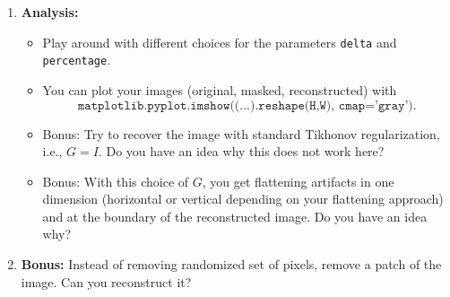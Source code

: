 \begin{enumerate}
\begin{itemize}
	 \end{itemize}
 	\item \textbf{Analysis:} 
 	\begin{itemize}
 		\item Play around with different choices for the parameters \texttt{delta} and \texttt{percentage}.
 		\item You can plot your images (original, masked, reconstructed) with $$\texttt{matplotlib.pyplot.imshow((...).reshape(H,W), cmap='gray')}.$$
 		\item Bonus: Try to recover the image with standard Tikhonov regularization, i.e., $G=I$. Do you have an idea why this does not work here?
 		\item Bonus: With this choice of $G$, you get flattening artifacts in one dimension (horizontal or vertical depending on your flattening approach) and at the boundary of the reconstructed image. Do you have an idea why? 
 	\end{itemize}
 \item \textbf{Bonus:} Instead of removing randomized set of pixels, remove a patch of the image. Can you reconstruct it?
\end{enumerate}


